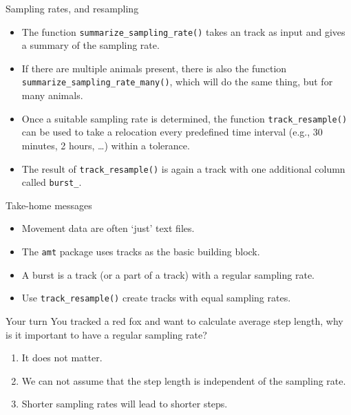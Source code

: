 \documentclass[ignorenonframetext,,t]{beamer}
\providecommand{\tightlist}{%
\setlength{\itemsep}{0pt}\setlength{\parskip}{0pt}}
\providecommand{\tightlist}{%
\setlength{\itemsep}{0pt}\setlength{\parskip}{0pt}}
\renewcommand{\tightlist}{\setlength{\itemsep}{1.4ex}\setlength{\parskip}{0pt}}
\begin{document}
\begin{frame}[fragile]{Sampling rates, and resampling}
\protect\hypertarget{sampling-rates-and-resampling}{}
\begin{itemize}
\tightlist
\item
  The function \texttt{summarize\_sampling\_rate()} takes an track as
  input and gives a summary of the sampling rate.
\item
  If there are multiple animals present, there is also the function
  \texttt{summarize\_sampling\_rate\_many()}, which will do the same
  thing, but for many animals.
\end{itemize}
\end{frame}

\begin{frame}[fragile]
\begin{itemize}
\tightlist
\item
  Once a suitable sampling rate is determined, the function
  \texttt{track\_resample()} can be used to take a relocation every
  predefined time interval (e.g., 30 minutes, 2 hours, \ldots) within a
  tolerance.
\item
  The result of \texttt{track\_resample()} is again a track with one
  additional column called \texttt{burst\_}.
\end{itemize}
\end{frame}

\begin{frame}[fragile]{Take-home messages}
\protect\hypertarget{take-home-messages}{}
\begin{itemize}
\tightlist
\item
  Movement data are often `just' text files.
\item
  The \texttt{amt} package uses tracks as the basic building block.
\item
  A burst is a track (or a part of a track) with a regular sampling
  rate.
\item
  Use \texttt{track\_resample()} create tracks with equal sampling
  rates.
\end{itemize}
\end{frame}

\begin{frame}{Your turn}
\protect\hypertarget{your-turn}{}
You tracked a red fox and want to calculate average step length, why is
it important to have a regular sampling rate?

\begin{enumerate}
\tightlist
\item
  It does not matter.
\item
  We can not assume that the step length is independent of the sampling
  rate.
\item
  Shorter sampling rates will lead to shorter steps.
\end{enumerate}
\end{frame}
\end{document}
